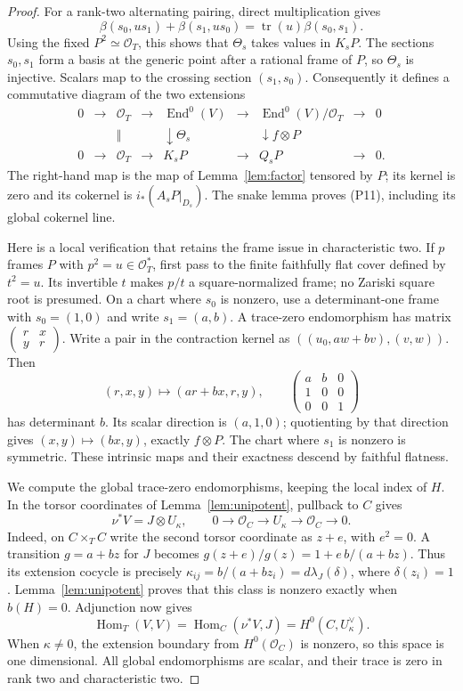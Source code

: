 \documentclass[11pt]{article}
\theoremstyle{definition}\newtheorem{definition}[theorem]{Definition}
\theoremstyle{remark}\newtheorem{remark}[theorem]{Remark}
\newcommand{\OO}{\mathcal O}
\newcommand{\End}{\operatorname{End}}
\begin{document}
\begin{proof}
For a rank-two alternating pairing, direct multiplication gives
\[
 \beta(s_0,us_1)+\beta(s_1,us_0)
       =\operatorname{tr}(u)\beta(s_0,s_1).
\]
Using the fixed $P^2\simeq\OO_T$, this shows that $\Theta_s$ takes values in
$K_sP$. The sections $s_0,s_1$ form a basis at the generic point after a
rational frame of $P$, so $\Theta_s$ is injective. Scalars map to the
crossing section $(s_1,s_0)$. Consequently it defines a commutative diagram
of the two extensions
\[
\begin{array}{ccccccccc}
0&\to&\OO_T&\to&\End^0(V)&\to&\End^0(V)/\OO_T&\to&0\\
 &&\Vert&&\downarrow\Theta_s&&\downarrow f\otimes P\\
0&\to&\OO_T&\to&K_sP&\to&Q_sP&\to&0.
\end{array}
\]
The right-hand map is the map of Lemma~\ref{lem:factor} tensored by $P$;
its kernel is zero and its cokernel is $i_*(A_sP|_{D_s})$. The snake lemma
proves (P11), including its global cokernel line.

Here is a local verification that retains the frame issue in characteristic
two. If $p$ frames $P$ with $p^2=u\in\OO_T^*$, first pass to the finite
faithfully flat cover defined by $t^2=u$. Its invertible $t$ makes $p/t$
a square-normalized frame; no Zariski square root is presumed. On a chart
where $s_0$ is nonzero, use a determinant-one frame with $s_0=(1,0)$ and
write $s_1=(a,b)$. A trace-zero endomorphism has matrix
$\left(\begin{smallmatrix}r&x\\y&r\end{smallmatrix}\right)$.
Write a pair in the contraction kernel as
$((u_0,aw+bv),(v,w))$. Then
\[
 (r,x,y)\longmapsto(ar+bx,r,y),\qquad
 \begin{pmatrix}a&b&0\\1&0&0\\0&0&1\end{pmatrix}
\]
has determinant $b$. Its scalar direction is $(a,1,0)$; quotienting by
that direction gives $(x,y)\mapsto(bx,y)$, exactly $f\otimes P$.
The chart where $s_1$ is nonzero is symmetric. These intrinsic maps and
their exactness descend by faithful flatness.

We compute the global trace-zero endomorphisms, keeping the local index of
$H$. In the torsor coordinates of Lemma~\ref{lem:unipotent}, pullback to
$C$ gives
\[
 \nu^*V=J\otimes U_\kappa,
 \qquad 0\to\OO_C\to U_\kappa\to\OO_C\to0.
\]
Indeed, on $C\times_T C$ write the second torsor coordinate as $z+e$, with
$e^2=0$. A transition $g=a+bz$ for $J$ becomes
$g(z+e)/g(z)=1+e\,b/(a+bz)$. Thus its extension cocycle is precisely
$\kappa_{ij}=b/(a+bz_i)=d\lambda_J(\delta)$, where
$\delta(z_i)=1$. Lemma~\ref{lem:unipotent} proves that this class is nonzero
exactly when $b(H)=0$.
Adjunction now gives
\[
 \operatorname{Hom}_T(V,V)
 =\operatorname{Hom}_C(\nu^*V,J)=H^0(C,U_\kappa^\vee).
\]
When $\kappa\ne0$, the extension boundary from $H^0(\OO_C)$ is nonzero,
so this space is one dimensional. All global endomorphisms are scalar,
and their trace is zero in rank two and characteristic two.


\end{proof}
\end{document}
